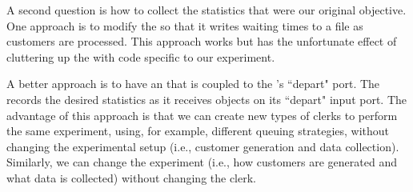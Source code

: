 A second question is how to collect the statistics that were our original objective. One approach is to modify the  so that it writes waiting times to a file as customers are processed. This approach works but has the unfortunate effect of cluttering up the  with code specific to our experiment.

A better approach is to have an  that is coupled to the 's ``depart" port. The  records the desired statistics as it receives  objects on its ``depart" input port. The advantage of this approach is that we can create new types of clerks to perform the same experiment, using, for example, different queuing strategies, without changing the experimental setup (i.e., customer generation and data collection). Similarly, we can change the experiment (i.e., how customers are generated and what data is collected) without changing the clerk.

